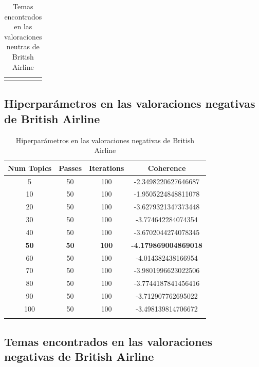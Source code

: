 \documentclass{report}
\begin{document}
{{\begin{longtable}{|p{1cm}|p{4cm}|p{4cm}|p{6cm}|}
                    \hline
                    \caption{Temas encontrados en las valoraciones neutras de British Airline}
                \end{longtable}
            \clearpage\subsection{Hiperparámetros en las valoraciones negativas de British Airline}
                \label{tab:hiperparametros_british_airline_negativas}
                \begin{longtable}{|c|c|c|c|}
                    \hline
                    \textbf{Num Topics} & \textbf{Passes} & \textbf{Iterations} & \textbf{Coherence} \\
                    \hline
                    5 & 50 & 100 & -2.3498220627646687 \\
                    \hline
                    10 & 50 & 100 & -1.9505224848811078 \\
                    \hline
                    20 & 50 & 100 & -3.6279321347373448 \\
                    \hline
                    30 & 50 & 100 & -3.774642284074354 \\
                    \hline
                    40 & 50 & 100 & -3.6702044274078345 \\
                    \hline
                    \textbf{50} & \textbf{50} & \textbf{100} & \textbf{-4.179869004869018} \\
                    \hline
                    60 & 50 & 100 & -4.014382438166954 \\
                    \hline
                    70 & 50 & 100 & -3.9801996623022506 \\
                    \hline
                    80 & 50 & 100 & -3.7744187841456416 \\
                    \hline
                    90 & 50 & 100 & -3.712907762695022 \\
                    \hline
                    100 & 50 & 100 & -3.498139814706672 \\
                    \hline
                    \caption{Hiperparámetros en las valoraciones negativas de British Airline}
                \end{longtable}
            \clearpage\subsection{Temas encontrados en las valoraciones negativas de British Airline}
}}
\end{document}
